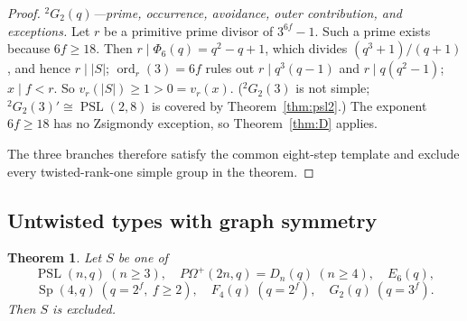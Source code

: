 \documentclass[11pt]{amsart}
\newtheorem{theorem}{Theorem}[section]
\theoremstyle{definition}
\theoremstyle{remark}
\DeclareMathOperator{\PSL}{PSL}
\DeclareMathOperator{\Sp}{Sp}
\DeclareMathOperator{\ord}{ord}
\newcommand{\vp}[1]{v_{#1}}
\begin{document}
\begin{proof}
\emph{${}^2G_2(q)$---prime, occurrence, avoidance, outer contribution, and
exceptions.} Let $r$ be a primitive prime divisor of $3^{6f}-1$. Such a prime exists because $6f\geq18$. Then
$r\mid\Phi_6(q)=q^2-q+1$, which divides $(q^3+1)/(q+1)$, and hence
$r\mid|S|$;
$\ord_r(3)=6f$ rules out $r\mid q^3(q-1)$ and $r\mid q(q^2-1)$;
$x\mid f<r$. So $\vp{r}(|S|)\geq1>0=\vp{r}(x)$.
(${}^2G_2(3)$ is not simple; ${}^2G_2(3)'\cong\PSL(2,8)$ is covered by
Theorem~\ref{thm:psl2}.) The exponent $6f\geq18$ has no Zsigmondy
exception, so Theorem~\ref{thm:D} applies.

The three branches therefore satisfy the common eight-step template and
exclude every twisted-rank-one simple group in the theorem.
\end{proof}

\subsection{Untwisted types with graph symmetry}\label{app:graph}

\begin{theorem}\label{thm:graph}
Let $S$ be one of
\[
\PSL(n,q)\ (n\geq3),\quad P\Omega^+(2n,q)=D_n(q)\ (n\geq4),\quad
E_6(q),
\]
\[
\Sp(4,q)\ (q=2^f,\ f\geq2),\quad F_4(q)\ (q=2^f),\quad
G_2(q)\ (q=3^f).
\]
Then $S$ is excluded.
\end{theorem}
\end{document}
